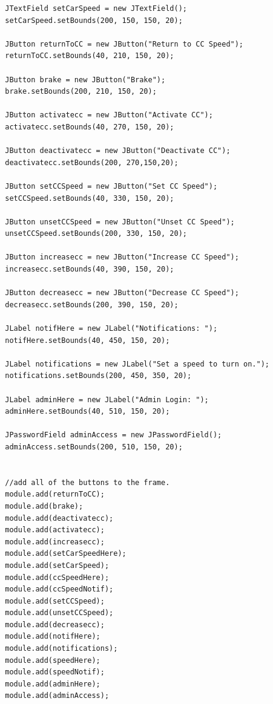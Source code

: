 \documentclass[preprint,11pt,3p]{article}
\begin{document}
\begin{lstlisting}
        JTextField setCarSpeed = new JTextField();
        setCarSpeed.setBounds(200, 150, 150, 20);

        JButton returnToCC = new JButton("Return to CC Speed");
        returnToCC.setBounds(40, 210, 150, 20);

        JButton brake = new JButton("Brake");
        brake.setBounds(200, 210, 150, 20);

        JButton activatecc = new JButton("Activate CC");
        activatecc.setBounds(40, 270, 150, 20);

        JButton deactivatecc = new JButton("Deactivate CC");
        deactivatecc.setBounds(200, 270,150,20);

        JButton setCCSpeed = new JButton("Set CC Speed");
        setCCSpeed.setBounds(40, 330, 150, 20);

        JButton unsetCCSpeed = new JButton("Unset CC Speed");
        unsetCCSpeed.setBounds(200, 330, 150, 20);

        JButton increasecc = new JButton("Increase CC Speed");
        increasecc.setBounds(40, 390, 150, 20);

        JButton decreasecc = new JButton("Decrease CC Speed");
        decreasecc.setBounds(200, 390, 150, 20);

        JLabel notifHere = new JLabel("Notifications: ");
        notifHere.setBounds(40, 450, 150, 20);

        JLabel notifications = new JLabel("Set a speed to turn on.");
        notifications.setBounds(200, 450, 350, 20);

        JLabel adminHere = new JLabel("Admin Login: ");
        adminHere.setBounds(40, 510, 150, 20);

        JPasswordField adminAccess = new JPasswordField(); 
        adminAccess.setBounds(200, 510, 150, 20);


        //add all of the buttons to the frame. 
        module.add(returnToCC);
        module.add(brake);
        module.add(deactivatecc);
        module.add(activatecc);
        module.add(increasecc);
        module.add(setCarSpeedHere);
        module.add(setCarSpeed);
        module.add(ccSpeedHere);
        module.add(ccSpeedNotif);
        module.add(setCCSpeed);
        module.add(unsetCCSpeed);
        module.add(decreasecc);
        module.add(notifHere);
        module.add(notifications);
        module.add(speedHere);
        module.add(speedNotif);
        module.add(adminHere);
        module.add(adminAccess);
        


\end{lstlisting}
\end{document}
